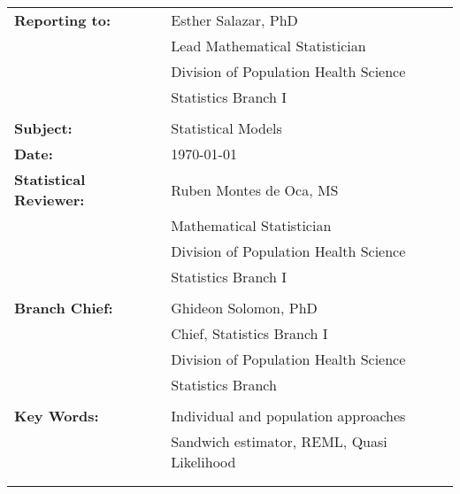 \documentclass[letterpaper,11pt]{article}
\begin{document}
\begin{tabular}[h!]{p{2in} p{10in}}
	\rule{0pt}{4ex}\textbf{Reporting to:}          & Esther Salazar, PhD  \\
																							   & Lead Mathematical Statistician \\
																							   & Division of Population Health Science \\
                                                 & Statistics Branch I\\
																							   & \\
	\rule{0pt}{4ex}\textbf{Subject:}               & Statistical Models \\
	\rule{0pt}{4ex}\textbf{Date:}                  & \today \\
	\rule{0pt}{4ex}\textbf{Statistical Reviewer:}  & Ruben Montes de Oca, MS \\
																							   & Mathematical Statistician \\
																							   & Division of Population Health Science \\
                                                 & Statistics Branch I\\
																							   & \\
	\rule{0pt}{4ex}\textbf{Branch Chief:}          & Ghideon Solomon, PhD \\
																							   & Chief, Statistics Branch I\\
																							   & Division of Population Health Science \\
                                                 & Statistics Branch \\
                                                 & \\
	\rule{0pt}{4ex}\textbf{Key Words:}  					 & Individual and population approaches\\
																								 & Sandwich estimator, REML, Quasi Likelihood \\
 \mbox{$\quad$} \\
 \mbox{$\quad$} \\
\end{tabular}

\newpage
\noindent 


\end{document}
